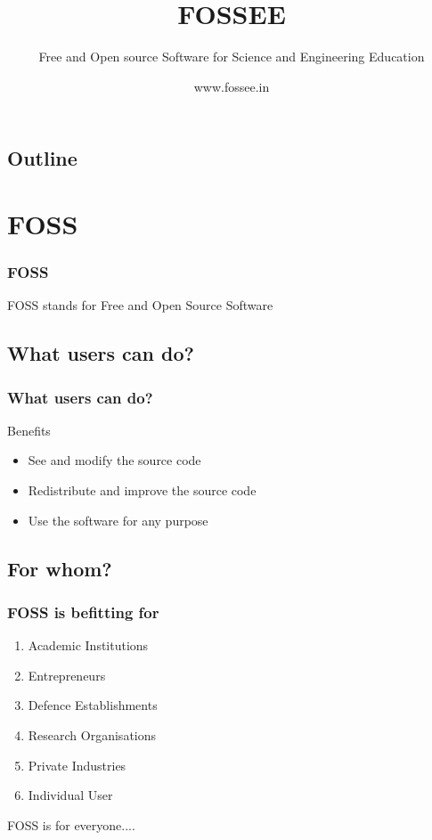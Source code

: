 \documentclass[compress,red]{beamer} %
\title{FOSSEE}
\subtitle{Free and Open source Software for Science and Engineering
Education}
\author[]{www.fossee.in}  %
\institute{IIT Bombay}
\date[]{} %
\begin{document}
\begin{frame}
	 \titlepage
\end{frame}

\begin{frame}
\section*{Outline}
\tableofcontents
\end{frame}


\section{FOSS}
\begin{frame}
\frametitle{FOSS}
\begin{definition}
\alert{FOSS} stands for Free and Open Source Software
\end{definition}
\end{frame}

\subsection{What users can do?}
\begin{frame}
\frametitle{What users can do?}
\begin{block}{Benefits}
\begin{itemize}
\item See and modify the source code \pause
\item Redistribute and improve the source code \pause
\item Use the software for any purpose 
\end{itemize}
\end{block}
\end{frame}

\subsection{For whom?}
\begin{frame}
\frametitle{FOSS is befitting for}
\begin{enumerate}
\item Academic Institutions\pause
\item Entrepreneurs \pause
\item Defence Establishments \pause
\item Research Organisations \pause
\item Private Industries \pause
\item Individual User \pause
\end{enumerate}
\begin{center}
FOSS is for everyone....
\end{center}
\end{frame}
\end{document}
